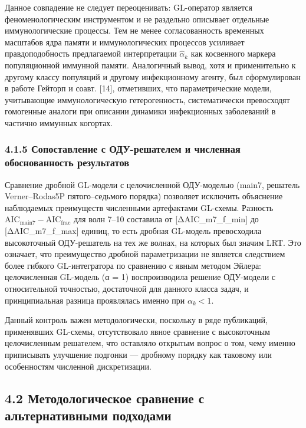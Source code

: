 \documentclass[12pt]{article}
\begin{document}
Данное совпадение не следует переоценивать: GL-оператор является
феноменологическим инструментом и не раздельно описывает отдельные
иммунологические процессы. Тем не менее согласованность временных
масштабов ядра памяти и иммунологических процессов усиливает
правдоподобность предлагаемой интерпретации \(\hat{\alpha}_k\) как
косвенного маркера популяционной иммунной памяти. Аналогичный вывод,
хотя и применительно к другому классу популяций и другому инфекционному
агенту, был сформулирован в работе Гейторп и соавт. {[}14{]},
отметивших, что параметрические модели, учитывающие иммунологическую
гетерогенность, систематически превосходят гомогенные аналоги при
описании динамики инфекционных заболеваний в частично иммунных когортах.

\subsubsection{4.1.5 Сопоставление с ОДУ-решателем и численная
обоснованность
результатов}\label{ux441ux43eux43fux43eux441ux442ux430ux432ux43bux435ux43dux438ux435-ux441-ux43eux434ux443-ux440ux435ux448ux430ux442ux435ux43bux435ux43c-ux438-ux447ux438ux441ux43bux435ux43dux43dux430ux44f-ux43eux431ux43eux441ux43dux43eux432ux430ux43dux43dux43eux441ux442ux44c-ux440ux435ux437ux443ux43bux44cux442ux430ux442ux43eux432}

Сравнение дробной GL-модели с целочисленной ОДУ-моделью (main7, решатель
Verner--Rodas5P пятого--седьмого порядка) позволяет исключить объяснение
наблюдаемых преимуществ численными артефактами GL-схемы. Разность
\(\text{AIC}_{\text{main7}} - \text{AIC}_{\text{frac}}\) для волн 7--10
составила от {[}ΔAIC\_m7\_f\_min{]} до {[}ΔAIC\_m7\_f\_max{]} единиц, то
есть дробная GL-модель превосходила высокоточный ОДУ-решатель на тех же
волнах, на которых был значим LRT. Это означает, что преимущество
дробной параметризации не является следствием более гибкого
GL-интегратора по сравнению с явным методом Эйлера: целочисленная
GL-модель (α = 1) воспроизводила решение ОДУ-модели с относительной
точностью, достаточной для данного класса задач, и принципиальная
разница проявлялась именно при \(\alpha_k < 1\).

Данный контроль важен методологически, поскольку в ряде публикаций,
применявших GL-схемы, отсутствовало явное сравнение с высокоточным
целочисленным решателем, что оставляло открытым вопрос о том, чему
именно приписывать улучшение подгонки --- дробному порядку как таковому
или особенностям численной дискретизации.

\subsection{4.2 Методологическое сравнение с альтернативными
подходами}\label{ux43cux435ux442ux43eux434ux43eux43bux43eux433ux438ux447ux435ux441ux43aux43eux435-ux441ux440ux430ux432ux43dux435ux43dux438ux435-ux441-ux430ux43bux44cux442ux435ux440ux43dux430ux442ux438ux432ux43dux44bux43cux438-ux43fux43eux434ux445ux43eux434ux430ux43cux438}
\end{document}
